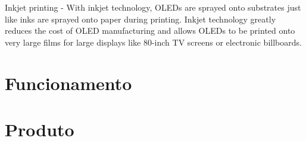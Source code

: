 Inkjet printing - With inkjet technology, OLEDs are sprayed onto substrates just like inks are sprayed onto paper during printing. Inkjet technology greatly reduces the cost of OLED manufacturing and allows OLEDs to be printed onto very large films for large displays like 80-inch TV screens or electronic billboards.


\section{Funcionamento}
\label{sec:funcionamento}


\section{Produto}
\label{sec:funcionamento}
